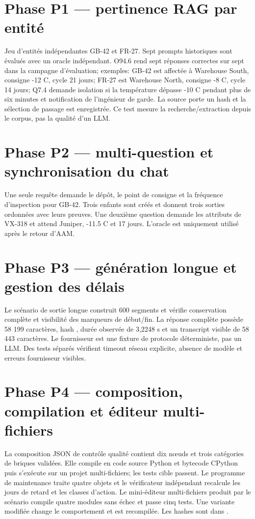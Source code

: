 \documentclass[11pt,a4paper]{article}
\begin{document}
\section{Phase P1 — pertinence RAG par entité}
Jeu d'entités indépendantes GB-42 et FR-27. Sept prompts historiques sont évalués avec un oracle indépendant. O94.6 rend sept réponses correctes sur sept dans la campagne d'évaluation; exemples: GB-42 est affectée à Warehouse South, consigne -12 C, cycle 21 jours; FR-27 est Warehouse North, consigne -8 C, cycle 14 jours; Q7.4 demande isolation si la température dépasse -10 C pendant plus de six minutes et notification de l'ingénieur de garde. La source porte un hash et la sélection de passage est enregistrée. Ce test mesure la recherche/extraction depuis le corpus, pas la qualité d'un LLM.

\section{Phase P2 — multi-question et synchronisation du chat}
Une seule requête demande le dépôt, le point de consigne et la fréquence d'inspection pour GB-42. Trois enfants sont créés et donnent trois sorties ordonnées avec leurs preuves. Une deuxième question demande les attributs de VX-318 et attend Juniper, -11.5 C et 17 jours. L'oracle est uniquement utilisé après le retour d'AAM.

\section{Phase P3 — génération longue et gestion des délais}
Le scénario de sortie longue construit 600 segments et vérifie conservation complète et visibilité des marqueurs de début/fin. La réponse complète possède 58 199 caractères, hash , durée observée de 3,2248 s et un transcript visible de 58 443 caractères. Le fournisseur est une fixture de protocole déterministe, pas un LLM. Des tests séparés vérifient timeout réseau explicite, absence de modèle et erreurs fournisseur visibles.

\section{Phase P4 — composition, compilation et éditeur multi-fichiers}
La composition JSON de contrôle qualité contient dix nœuds et trois catégories de briques validées. Elle compile en code source Python et bytecode CPython puis s'exécute sur un projet multi-fichiers; les tests cible passent. Le programme de maintenance traite quatre objets et le vérificateur indépendant recalcule les jours de retard et les classes d'action. Le mini-éditeur multi-fichiers produit par le scénario compile quatre modules sans échec et passe cinq tests. Une variante modifiée change le comportement et est recompilée. Les hashes sont dans .
\end{document}

